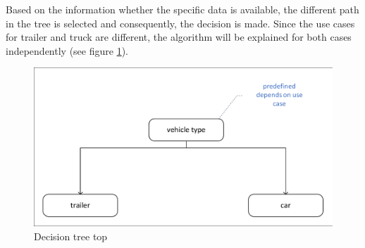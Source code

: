 Based on the information whether the specific data is available, the different path in the tree is selected and consequently, the decision is made. Since the use cases for trailer and truck are different, the algorithm will be explained for both cases independently (see figure \ref{fig::decisionTreeTop}).

\begin{figure} [h]
    \includegraphics[clip, trim=0.1cm 0.1cm 0.1cm 0.1cm, width=1\textwidth]{src/pic/DecisionTreeTop}
    \caption{Decision tree top}
    \label{fig::decisionTreeTop}
\end{figure}

